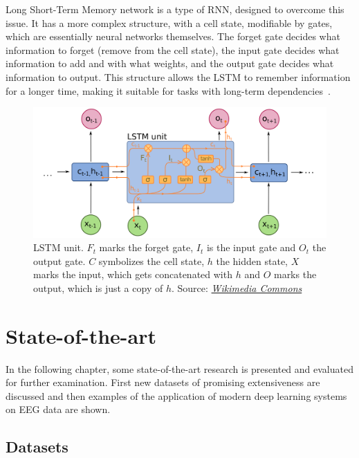 \documentclass[english, he, bc, kiv, iso690alph, viewonly]{fasthesis}
\begin{document}
Long Short-Term Memory network is a type of RNN, designed to overcome this issue. It has a more complex structure, with a cell state, modifiable by gates, which are essentially neural networks themselves. The forget gate decides what information to forget (remove from the cell state), the input gate decides what information to add and with what weights, and the output gate decides what information to output. This structure allows the LSTM to remember information for a longer time, making it suitable for tasks with long-term dependencies~\cite{olah:lstm:15}.

\begin{figure}
	\centering
	\includegraphics[width=\textwidth]{fig/lstm.png}
	\caption[LSTM unit]{LSTM unit. $F_t$ marks the forget gate, $I_t$ is the input gate and $O_t$ the output gate. $C$ symbolizes the cell state, $h$ the hidden state, $X$ marks the input, which gets concatenated with $h$ and $O$ marks the output, which is just a copy of $h$. Source: \href{https://commons.wikimedia.org/wiki/File:Long_Short-Term_Memory.svg}{\textit{Wikimedia Commons}}}
\end{figure}

\chapter{State-of-the-art}

In the following chapter, some state-of-the-art research is presented and evaluated for further examination. First new datasets of promising extensiveness are discussed and then examples of the application of modern deep learning systems on EEG data are shown.

\section{Datasets}
\end{document}
